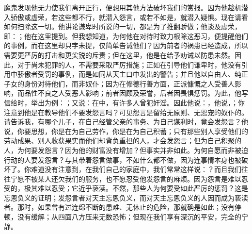 魔鬼发现他无力使我们离开正行，便想用其他方法破坏我们的赏报。因为他趁机潜入骄傲或虚荣，若这些都不行，就潜入怨言，或若不如是，就潜入疑惧。现在请看如何扫除这一切。他讲论谦卑时所说的一切，都是为了推翻骄傲；他谈及虚荣，即：；他在这里提到。但我想知道，为何他在对待时致力根除这恶习，便提醒他们的事例，而在这里却只字未提，仅简单告诫他们？因为前者的祸患已经造成，所以需要更严厉的打击和更尖锐的斥责；但在这里，他是在给予劝诫以防患未然。因此，对于尚未犯罪的人，不需要采取严厉措施；正如在引导他们谦卑时，他没有引用中骄傲者受罚的事例，而是如同从天主口中发出的警告；并且他以自由人、纯正子女的身份对待他们，而非奴仆；因为在修德行善方面，正派慷慨之人受善人影响，而品性不良之人受恶人影响；前者因顾及荣誉，后者因畏惧惩罚。为此，他写信给时，举出为例：；又说：在中，有许多人曾犯奸淫。因此他说：，他说，；你注意到他是在教导他们不要发怨言吗？可见怨言是留给无原则、无恩宠的奴仆的。请告诉我，有哪个儿子，在自己经管父亲的事务、为自己谋利时，竟会发怨言？他说，你要思想，你是在为自己劳作，你是在为自己积蓄；只有那些别人享受他们的劳动成果、别人收获果实而他们却背负重担的人，才会发怨言；但为自己积聚的人，为何要发怨言？因为他的财富没有增加？但事实并非如此。为何自愿而非被迫行动的人要发怨言？与其带着怨言做事，不如什么都不做，因为连事情本身也被破坏了。你难道没有注意到，在我们自己的家庭中，我们常常这样说：？而且我们往往宁愿不被某人还欠我们的服务，也不愿忍受他发怨言的麻烦。因为怨言是难以忍受的，极其难以忍受；它近乎亵渎。不然，那些人为何要受如此严厉的惩罚？这是忘恩负义的证明；发怨言者对天主忘恩负义，而对天主忘恩负义的人因而成为亵渎者。那时，如果曾有过连绵不断的患难、无休止的危险，那就确是如此；没有停顿，没有缓解；从四面八方压来无数恐怖；但现在我们享有深沉的平安，完全的宁静。\par

